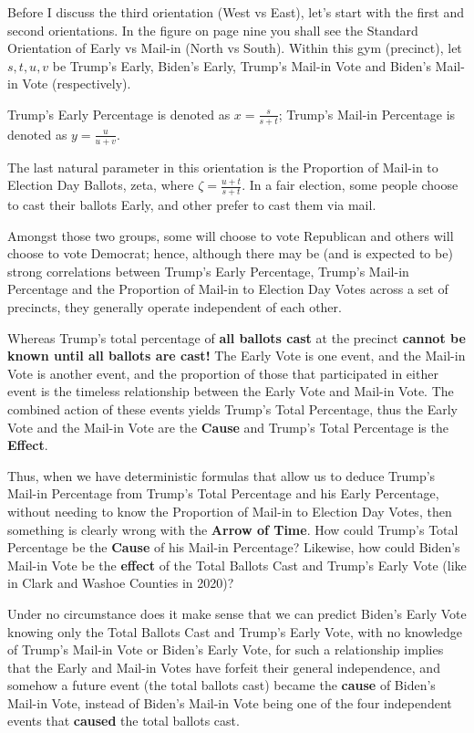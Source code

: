 Before I discuss the third orientation (West vs East), let's start with the first and second orientations. In the figure on page nine you shall see the Standard Orientation of Early vs Mail-in (North vs South). Within this gym (precinct), let $s,t,u,v$ be Trump's Early, Biden's Early, Trump's Mail-in Vote and Biden's Mail-in Vote (respectively).

Trump's Early Percentage is denoted as $x=\frac{s}{s+t}$; Trump's Mail-in Percentage is denoted as $y=\frac{u}{u+v}$.

The last natural parameter in this orientation is the Proportion of Mail-in to Election Day Ballots, zeta, where $\zeta=\frac{u+t}{s+t}$. In a fair election, some people choose to cast their ballots Early, and other prefer to cast them via mail. 

Amongst those two groups, some will choose to vote Republican and others will choose to vote Democrat; hence, although there may be (and is expected to be) strong correlations between Trump's Early Percentage, Trump's Mail-in Percentage and the Proportion of Mail-in to Election Day Votes across a set of precincts, they generally operate independent of each other.

Whereas Trump's total percentage of \textbf{all ballots cast} at the precinct \textbf{cannot be known until all ballots are cast!} The Early Vote is one event, and the Mail-in Vote is another event, and the proportion of those that participated in either event is the timeless relationship between the Early Vote and Mail-in Vote. The combined action of these events yields Trump's Total Percentage, thus the Early Vote and the Mail-in Vote are the \textbf{Cause} and Trump's Total Percentage is the \textbf{Effect}.

Thus, when we have deterministic formulas that allow us to deduce Trump's Mail-in Percentage from Trump's Total Percentage and his Early Percentage, without needing to know the Proportion of Mail-in to Election Day Votes, then something is clearly wrong with the \textbf{Arrow of Time}.  How could Trump's Total Percentage be the \textbf{Cause} of his Mail-in Percentage?
\newpage
Likewise, how could Biden's Mail-in Vote be the \textbf{effect} of the Total Ballots Cast and Trump's Early Vote (like in Clark and Washoe Counties in 2020)?

Under no circumstance does it make sense that we can predict Biden's Early Vote knowing only the Total Ballots Cast and Trump's Early Vote, with no knowledge of Trump's Mail-in Vote or Biden's Early Vote, for such a relationship implies that the Early and Mail-in Votes have forfeit their general independence, and somehow a future event (the total ballots cast) became the \textbf{cause} of Biden's Mail-in Vote, instead of Biden's Mail-in Vote being one of the four independent events that \textbf{caused} the total ballots cast.

